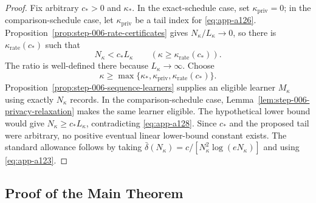 \begin{proof}
Fix arbitrary \(c_*>0\) and \(\kappa_*\).  In the exact-schedule case,
set \(\kappa_{\mathrm{priv}}=0\); in the comparison-schedule case, let
\(\kappa_{\mathrm{priv}}\) be a tail index for \eqref{eq:app-a126}.
Proposition~\ref{prop:step-006-rate-certificates} gives
\(N_\kappa/L_\kappa\to0\), so there is
\(\kappa_{\mathrm{rate}}(c_*)\) such that
\begin{equation}
N_\kappa<c_*L_\kappa
\qquad
(\kappa\geq\kappa_{\mathrm{rate}}(c_*)).
\label{eq:app-a128}
\end{equation}
The ratio is well-defined there because \(L_\kappa\to\infty\).
Choose
\begin{equation}
\kappa\geq
\max\{\kappa_*,\kappa_{\mathrm{priv}},
\kappa_{\mathrm{rate}}(c_*)\}.
\label{eq:app-a129}
\end{equation}
Proposition~\ref{prop:step-006-sequence-learners} supplies an eligible
learner \(M_\kappa\) using exactly \(N_\kappa\) records.  In the
comparison-schedule case,
Lemma~\ref{lem:step-006-privacy-relaxation} makes the same learner
eligible.  The hypothetical lower bound would give
\(N_\kappa\geq c_*L_\kappa\), contradicting \eqref{eq:app-a128}.
Since \(c_*\) and the proposed tail were arbitrary, no positive
eventual linear lower-bound constant exists.  The standard allowance
follows by taking
\(\bar\delta(N_\kappa)=
c/[N_\kappa^2\log(eN_\kappa)]\) and using \eqref{eq:app-a123}.
\end{proof}

\subsection{Proof of the Main Theorem}\label{app:main-proof}

